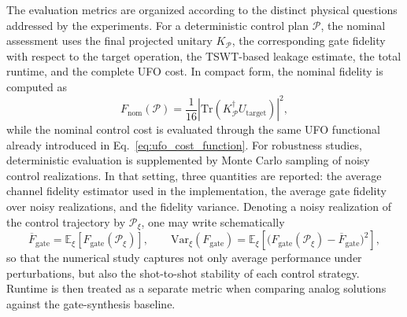 The evaluation metrics are organized according to the distinct physical questions addressed by the experiments. For a deterministic control plan \(\mathcal{P}\), the nominal assessment uses the final projected unitary \(K_{\mathcal{P}}\), the corresponding gate fidelity with respect to the target operation, the TSWT-based leakage estimate, the total runtime, and the complete UFO cost. In compact form, the nominal fidelity is computed as
\begin{equation}
F_{\mathrm{nom}}(\mathcal{P})
=
\frac{1}{16}
\left|
\mathrm{Tr}\!\left(
K_{\mathcal{P}}^{\dagger}U_{\mathrm{target}}
\right)
\right|^{2},
\label{eq:nominal_fidelity_validation}
\end{equation}
while the nominal control cost is evaluated through the same UFO functional already introduced in Eq.~\eqref{eq:ufo_cost_function}. For robustness studies, deterministic evaluation is supplemented by Monte Carlo sampling of noisy control realizations. In that setting, three quantities are reported: the average channel fidelity estimator used in the implementation, the average gate fidelity over noisy realizations, and the fidelity variance. Denoting a noisy realization of the control trajectory by \(\mathcal{P}_{\xi}\), one may write schematically
\begin{equation}
\overline{F}_{\mathrm{gate}}
=
\mathbb{E}_{\xi}
\!\left[
F_{\mathrm{gate}}(\mathcal{P}_{\xi})
\right],
\qquad
\mathrm{Var}_{\xi}(F_{\mathrm{gate}})
=
\mathbb{E}_{\xi}
\!\left[
\bigl(F_{\mathrm{gate}}(\mathcal{P}_{\xi})-\overline{F}_{\mathrm{gate}}\bigr)^2
\right],
\label{eq:robustness_metrics_validation}
\end{equation}
so that the numerical study captures not only average performance under perturbations, but also the shot-to-shot stability of each control strategy. Runtime is then treated as a separate metric when comparing analog solutions against the gate-synthesis baseline.

